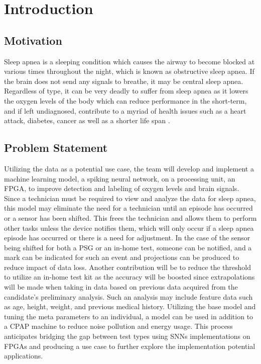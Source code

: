 \documentclass[12pt,titlepage]{article}
\begin{document}
\section{Introduction}
\subsection{Motivation}
Sleep apnea is a sleeping condition which causes the airway to become blocked at various times throughout the night, which is known as obstructive sleep apnea. 
If the brain does not send any signals to breathe, it may be central sleep apnea. Regardless of type, it can be very deadly to suffer from sleep apnea as it 
lowers the oxygen levels of the body which can reduce performance in the short-term, and if left undiagnosed, contribute to a myriad of health issues
such as a heart attack, diabetes, cancer as well as a shorter life span \cite{hopkins}.

\subsection{Problem Statement}
Utilizing the data as a potential use case, the team will develop and implement a machine learning model, a spiking neural network, on a processing unit,
an FPGA, to improve detection and labeling of oxygen levels and brain signals.  Since a technician must be required to view and analyze the data for sleep
apnea, this model may eliminate the need for a technician until an episode has occurred or a sensor has been shifted. This frees the technician and allows
them to perform other tasks unless the device notifies them, which will only occur if a sleep apnea episode has occurred or there is a need for adjustment.
In the case of the sensor being shifted for both a PSG or an in-home test, someone can be notified, and a mark can be indicated for such an event and projections
can be produced to reduce impact of data loss. Another contribution will be to reduce the threshold to utilize an in-home test kit as the accuracy will be boosted
since extrapolations will be made when taking in data based on previous data acquired from the candidate’s preliminary analysis. Such an analysis may include
feature data such as age, height, weight, and previous medical history. Utilizing the base model and tuning the meta parameters to an individual, a model can
be used in addition to a CPAP machine to reduce noise pollution and energy usage. This process anticipates bridging the gap between test types using SNNs
implementations on FPGAs and producing a use case to further explore the implementation potential applications.  
\end{document}
